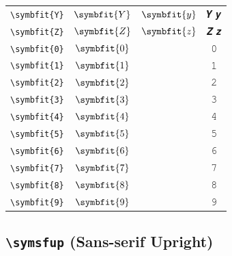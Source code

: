 \documentclass[12pt,a4paper]{article}
\begin{document}
\begin{longtable}{|c|c|c|c|}
\verb|\symbfit{Y}| & $\symbfit{Y}$ & $\symbfit{y}$ & 𝒀 𝒚 \\
\verb|\symbfit{Z}| & $\symbfit{Z}$ & $\symbfit{z}$ & 𝒁 𝒛 \\
\verb|\symbfit{0}| & $\symbfit{0}$ & & 𝟶 \\
\verb|\symbfit{1}| & $\symbfit{1}$ & & 𝟷 \\
\verb|\symbfit{2}| & $\symbfit{2}$ & & 𝟸 \\
\verb|\symbfit{3}| & $\symbfit{3}$ & & 𝟹 \\
\verb|\symbfit{4}| & $\symbfit{4}$ & & 𝟺 \\
\verb|\symbfit{5}| & $\symbfit{5}$ & & 𝟻 \\
\verb|\symbfit{6}| & $\symbfit{6}$ & & 𝟼 \\
\verb|\symbfit{7}| & $\symbfit{7}$ & & 𝟽 \\
\verb|\symbfit{8}| & $\symbfit{8}$ & & 𝟾 \\
\verb|\symbfit{9}| & $\symbfit{9}$ & & 𝟿 \\
\hline
\end{longtable}

\newpage

\subsection*{\texttt{\textbackslash{}symsfup} (Sans-serif Upright)}
\end{document}
